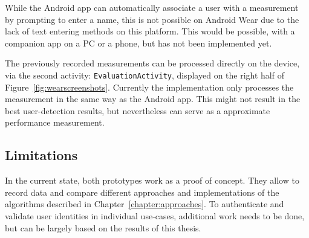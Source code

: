 While the Android \gls{app} can automatically associate a user with a measurement by prompting to enter a name, this is not possible on Android Wear due to the lack of text entering methods on this platform. This would be possible, \eg with a companion \gls{app} on a PC or a phone, but has not been implemented yet.

The previously recorded measurements can be processed directly on the device, via the second \gls{activity}: \lstinline$EvaluationActivity$, displayed on the right half of Figure~\ref{fig:wearscreenshots}. Currently the implementation only processes the measurement in the same way as the Android \gls{app}. This might not result in the best user-detection results, but nevertheless can serve as a approximate performance measurement.

\subsection{Limitations}
In the current state, both prototypes work as a proof of concept. They allow to record data and compare different approaches and implementations of the algorithms described in Chapter~\ref{chapter:approaches}. To authenticate and validate user identities in individual use-cases, additional work needs to be done, but can be largely based on the results of this thesis.
